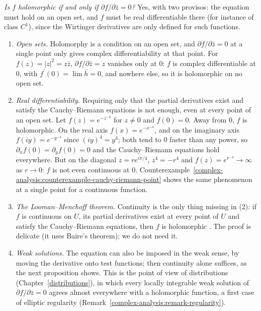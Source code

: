 \begin{remark}\label{complex-analysis:remark-dbar-hypotheses}
\emph{Is $f$ holomorphic if and only if $\partial f/\partial\bar z = 0$?} Yes, with two provisos: the equation must hold on an open set, and $f$ must be real differentiable there (for instance of class $C^1$), since
the Wirtinger derivatives are only defined for such functions.
\begin{enumerate}
\item \emph{Open sets.} Holomorphy is a condition on an open set, and $\partial f/\partial\bar z = 0$ at a single point only gives complex differentiability at that point. For $f(z) = |z|^2 = z\bar z$,
$\partial f/\partial\bar z = z$ vanishes only at $0$: $f$ is complex differentiable at $0$, with $f^{\prime}(0) = \lim\bar h = 0$, and nowhere else, so it is holomorphic on no open set.
\item \emph{Real differentiability.} Requiring only that the partial derivatives exist and satisfy the Cauchy--Riemann equations is not enough, even at every point of an open set. Let
$f(z) = e^{-z^{-4}}$ for $z \neq 0$ and $f(0) = 0$. Away from $0$, $f$ is holomorphic. On the real axis $f(x) = e^{-x^{-4}}$, and on the imaginary axis $f(iy) = e^{-y^{-4}}$ since $(iy)^4 = y^4$; both
tend to $0$ faster than any power, so $\partial_xf(0) = \partial_yf(0) = 0$ and the Cauchy--Riemann equations hold everywhere. But on the diagonal $z = re^{i\pi/4}$, $z^4 = -r^4$ and
$f(z) = e^{r^{-4}} \to \infty$ as $r \to 0$: $f$ is not even continuous at $0$. Counterexample~\ref{complex-analysis:counterexample-cauchy-riemann-point} shows the same phenomenon at a single point
for a continuous function.
\item \emph{The Looman--Menchoff theorem.} Continuity is the only thing missing in (2): if $f$ is continuous on $U$, its partial derivatives exist at every point of $U$ and satisfy the Cauchy--Riemann equations,
then $f$ is holomorphic \cite{gray-morris-1978}. The proof is delicate (it uses Baire's theorem); we do not need it.
\item \emph{Weak solutions.} The equation can also be imposed in the weak sense, by moving the derivative onto test functions; then continuity alone suffices, as the next proposition shows. This is the point of view of
distributions (Chapter~\ref{distributions}), in which every locally integrable weak solution of $\partial f/\partial\bar z = 0$ agrees almost everywhere with a holomorphic function, a first case of elliptic
regularity (Remark~\ref{complex-analysis:remark-regularity}).
\end{enumerate}
\end{remark}

